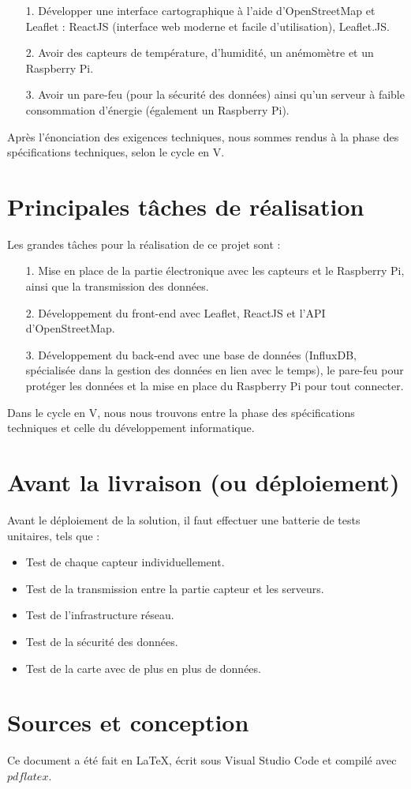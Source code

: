 \documentclass[titlepage]{article}
\begin{document}
	\begin{itemize}
		\item[1.] Développer une interface cartographique à l'aide d'OpenStreetMap et Leaflet : ReactJS (interface web moderne et facile d'utilisation), Leaflet.JS.
		\item[2.] Avoir des capteurs de température, d'humidité, un anémomètre et un Raspberry Pi.
		\item[3.] Avoir un pare-feu (pour la sécurité des données) ainsi qu'un serveur à faible consommation d’énergie (également un Raspberry Pi).
	\end{itemize}

	Après l'énonciation des exigences techniques, nous sommes rendus à la phase des spécifications techniques, selon le cycle en V.
	
	\section{Principales tâches de réalisation}

	Les grandes tâches pour la réalisation de ce projet sont :

	\begin{itemize}
		\item[1.] Mise en place de la partie électronique avec les capteurs et le Raspberry Pi, ainsi que la transmission des données.
		\item[2.] Développement du front-end avec Leaflet, ReactJS et l'API d'OpenStreetMap.
		\item[3.] Développement du back-end avec une base de données (InfluxDB, spécialisée dans la gestion des données en lien avec le temps), le pare-feu pour protéger les données et la mise en place du Raspberry Pi pour tout connecter.
	\end{itemize}

	Dans le cycle en V, nous nous trouvons entre la phase des spécifications techniques et celle du développement informatique.

	\section{Avant la livraison (ou déploiement)}

	Avant le déploiement de la solution, il faut effectuer une batterie de tests unitaires, tels que :

	\begin{itemize}
		\item Test de chaque capteur individuellement.
		\item Test de la transmission entre la partie capteur et les serveurs.
		\item Test de l'infrastructure réseau.
		\item Test de la sécurité des données.
		\item Test de la carte avec de plus en plus de données.
	\end{itemize}

	\clearpage

	\section{Sources et conception}

	Ce document a été fait en LaTeX, écrit sous Visual Studio Code et compilé avec $pdflatex$.
\end{document}
